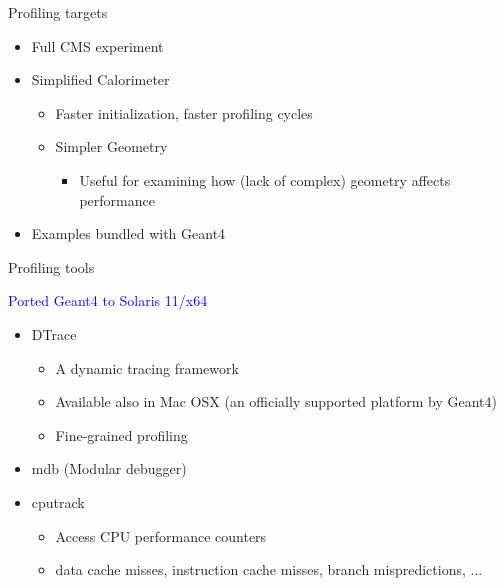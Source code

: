 \documentclass{beamer}
\begin{document}
\begin{frame}{Profiling targets}

\begin{itemize}
	\item Full CMS experiment
	\item Simplified Calorimeter

	\begin{itemize}
		\item Faster initialization, faster profiling cycles
		\item Simpler Geometry
		\begin{itemize}
			\item Useful for examining how (lack of complex) geometry affects performance
		\end{itemize}
	\end{itemize}
	
\item Examples bundled with Geant4
	
\end{itemize}
\end{frame}

\begin{frame}{Profiling tools}

\textcolor{blue}{Ported Geant4 to Solaris 11/x64}

\begin{itemize}
	\item DTrace

	\begin{itemize}
		\item A dynamic tracing framework
		\item Available also in Mac OSX (an officially supported platform by Geant4)
		\item Fine-grained profiling
	\end{itemize}

	\item mdb (Modular debugger)

	\item cputrack
	\begin{itemize}
		\item Access CPU performance counters
		\item data cache misses, instruction cache misses, branch mispredictions, ...
	\end{itemize}
\end{itemize}	

\end{frame}
\end{document}
